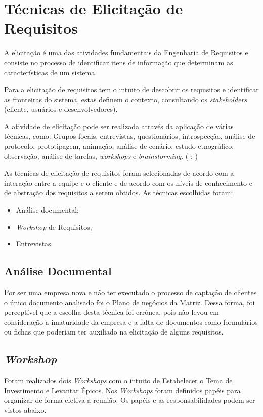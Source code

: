 \chapter{Técnicas de Elicitação de Requisitos}
A elicitação é uma das atividades fundamentais da Engenharia de Requisitos e consiste no processo de identificar
itens de informação que determinam as características de um sistema. \cite{jitnah} 

Para  a elicitação de requisitos tem o intuito de descobrir
os requisitos e identificar as fronteiras do sistema, estas definem o contexto, consultando os \textit{stakeholders} (cliente, usuários e desenvolvedores).

A atividade de elicitação pode ser realizada através da aplicação de várias técnicas, como: Grupos focais, entrevistas, questionários,
introspecção, análise de protocolo, prototipagem, animação, análise de cenário, estudo etnográfico, observação, análise de tarefas,
\textit{workshops} e \textit{brainstorming}. (\cite{jitnah} ; \cite{coulin})

\label{tecnicas}

As técnicas de elicitação de requisitos foram selecionadas de acordo com a interação entre a equipe e o cliente e de acordo com os níveis de conhecimento e de abstração dos requisitos a serem obtidos.
As técnicas escolhidas foram:\\
\begin{itemize}
\item Análise documental;
\item \textit{Workshop} de Requisitos;
\item Entrevistas.
\end{itemize}

\section{Análise Documental}
Por ser uma empresa nova e não ter executado o processo de captação de clientes o único documento analisado foi o Plano
de negócios da Matriz. Dessa forma, foi perceptível que a escolha desta técnica foi errônea, pois não levou
em consideração a imaturidade da empresa e a falta de documentos como formulários ou fichas que poderiam ter auxiliado
na elicitação de alguns requisitos.

\section{\textit{Workshop}}
  Foram realizados dois \textit{Workshops} com o intuito de Estabelecer o Tema de Investimento e Levantar Épicos. Nos \textit{Workshops}
  foram definidos papéis para organizar de forma efetiva a reunião. Os papéis e as responsabilidades podem ser vistos abaixo.
  
